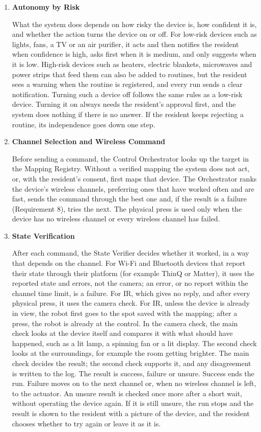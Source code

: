 \documentclass[conference]{IEEEtran}
\newcommand{\itemhead}[1]{\item \textbf{#1}\par\nobreak}
\begin{document}
\begin{enumerate}
\itemhead{Autonomy by Risk}
What the system does depends on how risky the device is, how confident it is, and whether the action turns the device on or off. For low-risk devices such as lights, fans, a TV or an air purifier, it acts and then notifies the resident when confidence is high, asks first when it is medium, and only suggests when it is low. High-risk devices such as heaters, electric blankets, microwaves and power strips that feed them can also be added to routines, but the resident sees a warning when the routine is registered, and every run sends a clear notification. Turning such a device off follows the same rules as a low-risk device. Turning it on always needs the resident's approval first, and the system does nothing if there is no answer. If the resident keeps rejecting a routine, its independence goes down one step.

\itemhead{Channel Selection and Wireless Command}
Before sending a command, the Control Orchestrator looks up the target in the Mapping Registry. Without a verified mapping the system does not act, or, with the resident's consent, first maps that device. The Orchestrator ranks the device's wireless channels, preferring ones that have worked often and are fast, sends the command through the best one and, if the result is a failure (Requirement 8), tries the next. The physical press is used only when the device has no wireless channel or every wireless channel has failed.

\itemhead{State Verification}
After each command, the State Verifier decides whether it worked, in a way that depends on the channel. For Wi-Fi and Bluetooth devices that report their state through their platform (for example ThinQ or Matter), it uses the reported state and errors, not the camera; an error, or no report within the channel time limit, is a failure. For IR, which gives no reply, and after every physical press, it uses the camera check. For IR, unless the device is already in view, the robot first goes to the spot saved with the mapping; after a press, the robot is already at the control. In the camera check, the main check looks at the device itself and compares it with what should have happened, such as a lit lamp, a spinning fan or a lit display. The second check looks at the surroundings, for example the room getting brighter. The main check decides the result; the second check supports it, and any disagreement is written to the log. The result is success, failure or unsure. Success ends the run. Failure moves on to the next channel or, when no wireless channel is left, to the actuator. An unsure result is checked once more after a short wait, without operating the device again. If it is still unsure, the run stops and the result is shown to the resident with a picture of the device, and the resident chooses whether to try again or leave it as it is.


\end{enumerate}
\end{document}
